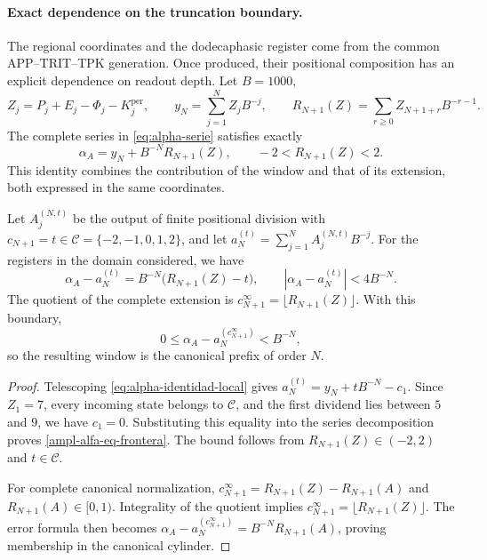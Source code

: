 \paragraph{Exact dependence on the truncation boundary.}
\label{ampl-alfa-frontera-exacta}
The regional coordinates and the dodecaphasic register come from the
common APP--TRIT--TPK generation. Once produced, their positional
composition has an explicit dependence on readout
depth. Let $B=1000$,
\[
 Z_j=P_j+E_j-\Phi_j-K_j^{\mathrm{per}},\qquad
 y_N=\sum_{j=1}^{N}Z_jB^{-j},\qquad
 R_{N+1}(Z)=\sum_{r\geq0}Z_{N+1+r}B^{-r-1}.
\]
The complete series in \eqref{eq:alpha-serie} satisfies exactly
\[
 \alpha_A=y_N+B^{-N}R_{N+1}(Z),\qquad
 -2<R_{N+1}(Z)<2.
\]
This identity combines the contribution of the window and that of its
extension, both expressed in the same coordinates.

\begin{proposition}
\label{ampl-alfa-prop-frontera}
Let $A_j^{(N,t)}$ be the output of finite positional division with
$c_{N+1}=t\in\mathcal C=\{-2,-1,0,1,2\}$, and let
$a_N^{(t)}=\sum_{j=1}^{N}A_j^{(N,t)}B^{-j}$. For the registers in the
domain considered, we have
\begin{equation}
 \alpha_A-a_N^{(t)}
 =B^{-N}\bigl(R_{N+1}(Z)-t\bigr),
 \qquad
 |\alpha_A-a_N^{(t)}|<4B^{-N}.
 \label{ampl-alfa-eq-frontera}
\end{equation}
The quotient of the complete extension is
$c_{N+1}^{\infty}=\lfloor R_{N+1}(Z)\rfloor$. With this boundary,
\[
 0\leq\alpha_A-a_N^{(c_{N+1}^{\infty})}<B^{-N},
\]
so the resulting window is the canonical prefix of order $N$.
\end{proposition}
\begin{proof}
Telescoping \eqref{eq:alpha-identidad-local} gives
$a_N^{(t)}=y_N+tB^{-N}-c_1$. Since $Z_1=7$, every incoming state
belongs to $\mathcal C$, and the first dividend lies between $5$ and $9$,
we have $c_1=0$. Substituting this equality into the series
decomposition proves \eqref{ampl-alfa-eq-frontera}. The bound follows from
$R_{N+1}(Z)\in(-2,2)$ and $t\in\mathcal C$.

For complete canonical normalization,
$c_{N+1}^{\infty}=R_{N+1}(Z)-R_{N+1}(A)$ and
$R_{N+1}(A)\in[0,1)$. Integrality of the quotient implies
$c_{N+1}^{\infty}=\lfloor R_{N+1}(Z)\rfloor$. The error formula
then becomes
$\alpha_A-a_N^{(c_{N+1}^{\infty})}=B^{-N}R_{N+1}(A)$, proving
membership in the canonical cylinder.
\end{proof}

